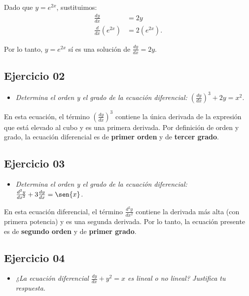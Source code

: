 \documentclass[12pt]{article}
\begin{document}
Dado que \(y = e^{2x}\), sustituimos:
\begin{align*}
    \frac{dy}{dx} &= 2y \\
    \frac{d}{dx}\left( e^{2x} \right) &= 2(e^{2x}).
\end{align*}

Por lo tanto, \(y = e^{2x}\) sí es una solución de \(\frac{dy}{dx} = 2y\).


\subsection*{\centering Ejercicio 02 }

\begin{itemize}
    \item \emph{Determina el orden y el grado de la ecuación diferencial: \(\left(\frac{dy}{dx}\right)^{3} + 2y = x^{2}\).}
\end{itemize}

En esta ecuación, el término \(\left( \frac{dy}{dx} \right)^{3}\) contiene la única derivada de la expresión que está elevado al cubo y es una primera derivada. Por definición de orden y grado, la ecuación diferencial es de \textbf{primer orden} y de \textbf{tercer grado}.

\subsection*{\centering Ejercicio 03 }

\begin{itemize}
    \item \emph{Determina el orden y el grado de la ecuación diferencial: \(\frac{d^{2}y}{dx^{2}} + 3\frac{dy}{dx} = \sen{x}\).}
\end{itemize}

En esta ecuación diferencial, el término \(\frac{d^{2}y}{dx^{2}}\) contiene la derivada más alta (con primera potencia) y es una segunda derivada. Por lo tanto, la ecuación presente es de \textbf{segundo orden} y de \textbf{primer grado}.

\subsection*{\centering Ejercicio 04 }

\begin{itemize}
    \item \emph{¿La ecuación diferencial \(\frac{dy}{dx} + y^{2} = x\) es lineal o no lineal? Justifica tu respuesta.}
\end{itemize}
\end{document}

